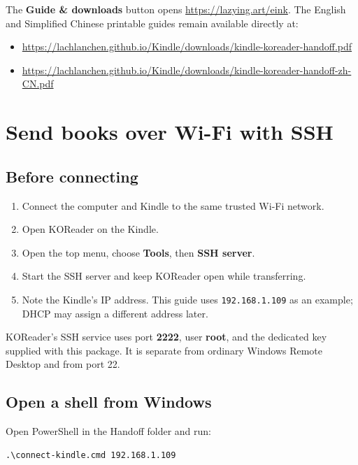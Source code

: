 \documentclass[10pt,letterpaper]{article}
\begin{document}
The \textbf{Guide \& downloads} button opens \url{https://lazying.art/eink}.
The English and Simplified Chinese printable guides remain available directly at:

\begin{itemize}
  \item \url{https://lachlanchen.github.io/Kindle/downloads/kindle-koreader-handoff.pdf}
  \item \url{https://lachlanchen.github.io/Kindle/downloads/kindle-koreader-handoff-zh-CN.pdf}
\end{itemize}

\section{Send books over Wi-Fi with SSH}

\subsection{Before connecting}

\begin{enumerate}
  \item Connect the computer and Kindle to the same trusted Wi-Fi network.
  \item Open KOReader on the Kindle.
  \item Open the top menu, choose \textbf{Tools}, then \textbf{SSH server}.
  \item Start the SSH server and keep KOReader open while transferring.
  \item Note the Kindle's IP address. This guide uses \texttt{192.168.1.109} as an example; DHCP may assign a different address later.
\end{enumerate}

KOReader's SSH service uses port \textbf{2222}, user \textbf{root}, and the dedicated key supplied with this package. It is separate from ordinary Windows Remote Desktop and from port 22.

\subsection{Open a shell from Windows}

Open PowerShell in the Handoff folder and run:

\begin{Verbatim}[fontsize=\small]
.\connect-kindle.cmd 192.168.1.109
\end{Verbatim}
\end{document}
